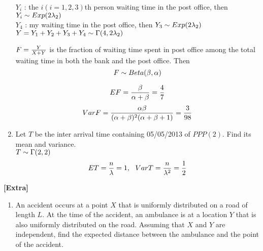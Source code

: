 \documentclass[12pt]{article}%
\newcommand{\0}{{\bf 0}}
\begin{document}
\begin{enumerate}
$Y_i$ : the $i(i=1,2,3)$th person waiting time in the post office, then $Y_i \sim Exp(2\lambda_2)$\\
$Y_4$ : my waiting time in the post office, then $Y_3 \sim Exp(2\lambda_2)$\\
$Y=Y_1+Y_2+Y_3+Y_4 \sim \Gamma(4,2 \lambda_2)$



$F=\frac{Y}{X+Y}$ is the fraction of waiting time spent in post office
among the total waiting time in both the bank and the post office. Then
$$F \sim Beta(\beta,\alpha)$$



$$EF=\frac{\beta}{\alpha+\beta}=\frac{4}{7}$$
$$VarF=\frac{\alpha\beta}{(\alpha+\beta)^2(\alpha+\beta+1)}=\frac{3}{98}$$



\item
Let $T$ be the inter arrival time containing 05/05/2013 of $PPP(2)$.
Find its mean and variance.
\\
{\color{blue}{\bf Sol.}}
$T \sim \Gamma(2,2)$
$$ET=\frac{n}{\lambda}=1,~~ VarT=\frac{n}{\lambda^2}=\frac{1}{2}$$








\end{enumerate}





\begin{center}
{\Large\bf [Extra]} 
\end{center}






\begin{enumerate}
\item
An accident occurs at a point $X$ that is uniformly distributed on a road of length $L$. 
At the time of the accident, an ambulance is at a location $Y$ that is also uniformly
distributed on the road. Assuming that $X$ and $Y$ are independent, find the expected
distance between the ambulance and the point of the accident.





\end{enumerate}
\end{document}
